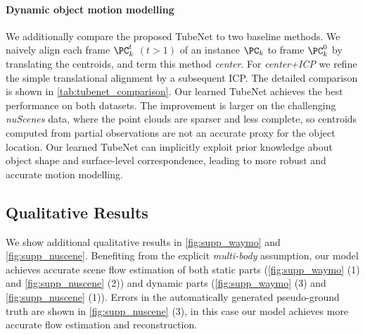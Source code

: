 \paragraph{Dynamic object motion modelling}
We additionally compare the proposed TubeNet to two baseline methods. We naively align each frame $\PC_k^t$ $(t>1)$ of an instance $\PC_k$ to frame $\PC_k^0$ by %
translating the centroids, and term this method \textit{center}. For \textit{center+ICP} we refine the simple translational alignment by a subsequent ICP. The detailed comparison is shown in \cref{tab:tubenet_comparison}. Our learned TubeNet achieves the best performance on both datasets. The improvement is larger on the challenging \emph{nuScenes} data, where the point clouds are sparser and less complete, so centroids computed from partial observations are not an accurate proxy for the object location. Our learned TubeNet can implicitly exploit prior knowledge about object shape and surface-level correspondence, leading to more robust and accurate motion modelling. 

\subsection{Qualitative Results}
\label{sec:supp_qual}
We show additional qualitative results in \cref{fig:supp_waymo} and \cref{fig:supp_nuscene}. Benefiting from the explicit \textit{multi-body} assumption, our model achieves accurate scene flow estimation of both static parts (\cref{fig:supp_waymo} (1) and \cref{fig:supp_nuscene} (2)) and dynamic parts (\cref{fig:supp_waymo} (3) and \cref{fig:supp_nuscene} (1)). Errors in the automatically generated pseudo-ground truth are shown in \cref{fig:supp_nuscene} (3), in this case our model achieves more accurate flow estimation and reconstruction.  



